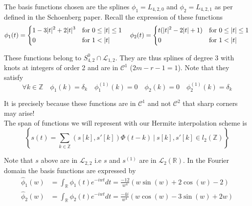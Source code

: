 \documentclass[a4paper, 11pt]{article}
\begin{document}
The basis functions chosen are the splines $\phi_1 = L_{4, 2, 0}$ and $\phi_2 = L_{4, 2, 1}$ as per defined in the 
Schoenberg paper. Recall the expression of these functions
\begin{equation}
    \phi_1(t) = \begin{dcases}
                1-3|t|^2 + 2|t|^3 &\text{for } 0 \leq |t| \leq 1\\
                0 &\text{for } 1 < |t|\\
            \end{dcases} \quad
    \hfill
    \phi_2(t) = \begin{dcases}
               t(|t|^2-2|t|+1) &\text{for } 0 \leq |t| \leq 1\\
                0 &\text{for } 1 < |t|\\
              \end{dcases}
\end{equation}

These functions belong to $S^0_{4,2} \cap \mathcal{L}_{1,2}$. They are thus splines of degree 3 with knots at integers 
of order 2 and are in $\mathcal{C}^1$ ($2m-r-1 = 1$). Note that they satisfy
\begin{equation*}
  \forall k \in \mathbb{Z} \quad \phi_1(k) = \delta_k \quad \phi_1^{(1)}(k) = 0 \quad \phi_2(k) = 0 \quad 
  \phi_2^{(1)}(k) = \delta_k
\end{equation*}

It is precisely because these functions are in $\mathcal{C}^1$ and not $\mathcal{C}^2$ that sharp corners may arise! \\

The span of functions we will represent with our Hermite interpolation scheme is
\begin{equation*}
  \left\{s(t) = \sum_{k \in \mathbb{Z}} (s[k], s'[k]) \Phi(t-k) \ | \ s[k], s'[k] \in l_2(\mathbb{Z}) \right\}
\end{equation*}

Note that $s$ above are in $\mathcal{L}_{2,2}$ i.e $s$ and $s^{(1)}$ are in $\mathcal{L}_2(\mathbb{R})$. In the Fourier 
domain the basis functions are expressed by
\begin{align}
  \hat{\phi}_1(w) &= \int_{\mathbb{R}} \phi_1(t) e^{-iwt} dt = \frac{-12}{w^4}(w\sin(w) + 2\cos(w) - 2) \\
  \hat{\phi}_2(w) &= \int_{\mathbb{R}} \phi_2(t) e^{-iwt} dt = \frac{-4i}{w^4}(w\cos(w) - 3\sin(w) + 2w) \\
\end{align}
\end{document}
